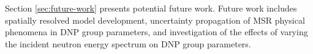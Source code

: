 Section \ref{sec:future-work} presents potential future work.
Future work includes spatially resolved model development, uncertainty propagation of \gls{MSR} physical phenomena in \gls{DNP} group parameters, and investigation of the effects of varying the incident neutron energy spectrum on \gls{DNP} group parameters.